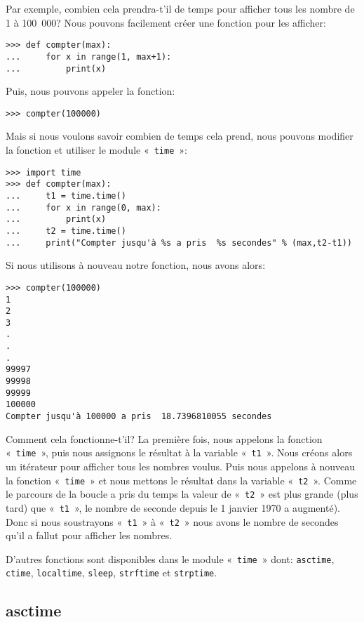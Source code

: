 Par exemple, combien cela prendra-t'il de temps pour afficher tous les nombre de 1 à 100~000?  Nous pouvons facilement créer une fonction pour les afficher:
\begin{Verbatim}[frame=single,rulecolor=\color{gray}]
>>> def compter(max):
...     for x in range(1, max+1):
...         print(x)
\end{Verbatim}

Puis, nous pouvons appeler la fonction:
\begin{Verbatim}[frame=single,rulecolor=\color{gray}]
>>> compter(100000)
\end{Verbatim}

Mais si nous voulons savoir combien de temps cela prend, nous pouvons modifier la fonction et utiliser le module  «~\texttt{time}~»:

\begin{Verbatim}[frame=single,rulecolor=\color{gray}]
>>> import time
>>> def compter(max):
...     t1 = time.time()
...     for x in range(0, max):
...         print(x)
...     t2 = time.time()
...     print("Compter jusqu'à %s a pris  %s secondes" % (max,t2-t1))
\end{Verbatim}

Si nous utilisons à nouveau notre fonction, nous avons alors:

\begin{Verbatim}[frame=single,rulecolor=\color{gray}]
>>> compter(100000)
1
2
3
.
.
.
99997
99998
99999
100000
Compter jusqu'à 100000 a pris  18.7396810055 secondes
\end{Verbatim}

Comment cela fonctionne-t'il? La première fois, nous appelons la fonction «~\texttt{time}~», puis nous assignons le résultat à la variable «~\texttt{t1}~». Nous créons alors un itérateur pour afficher tous les nombres voulus. Puis nous appelons à nouveau la fonction «~\texttt{time}~» et nous mettons le résultat dans la variable «~\texttt{t2}~». Comme le parcours de la boucle a pris du temps la valeur de «~\texttt{t2}~» est plus grande (plus tard) que «~\texttt{t1}~», le nombre de seconde depuis  le 1 janvier 1970 a augmenté). Donc si nous soustrayons «~\texttt{t1}~» à «~\texttt{t2}~» nous avons le nombre de secondes qu'il a fallut pour afficher les nombres.

D'autres fonctions sont disponibles dans le module «~\texttt{time}~» dont: \verb+asctime+, \verb+ctime+, \verb+localtime+, \verb+sleep+, \verb+strftime+ et \verb+strptime+.

\subsection{asctime}


